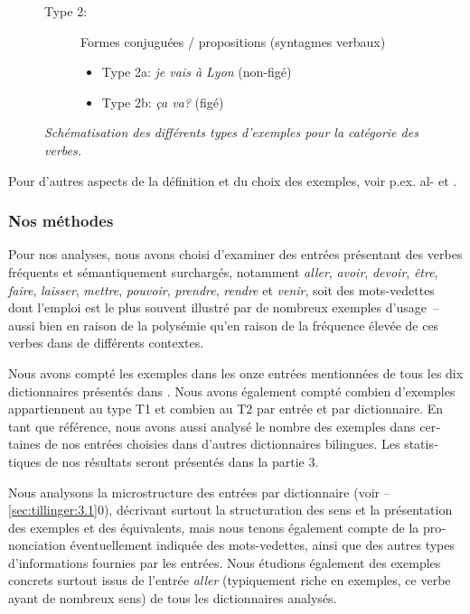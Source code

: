 \documentclass[output=paper,colorlinks,citecolor=brown,arabicfont,chinesefont,booklanguage=french]{langscibook}
\begin{document}
\begin{otherlanguage}{french}
\begin{figure}
{\begin{description}
\item[Type 2:] Formes conjuguées / propositions (syntagmes verbaux)
\begin{itemize}[leftmargin=*]
\item Type 2a: \textit{je vais à Lyon} (non-figé)
\item Type 2b: \textit{ça va?} (figé)
\end{itemize}
\end{description}}
\caption{\emph{Schématisation des différents types d’exemples pour la catégorie des verbes.}}
\label{fig:tillinger:Figure 1}
\end{figure}

Pour d’autres aspects de la définition et du choix des exemples, voir p.ex. al-\citealt{Kasimi1983, Piotrowski2000, Nielsen2014, Karpinska2015}  et \citealt{Belleflamme2019}.

\subsubsection{Nos méthodes}\label{sec:tillinger:2.2.2}

Pour nos analyses, nous avons choisi d’examiner des entrées présentant des verbes fréquents et sémantiquement surchargés, notamment \emph{aller}, \emph{avoir}, \emph{devoir}, \emph{être}, \emph{faire}, \emph{laisser}, \emph{mettre}, \emph{pouvoir}, \emph{prendre}, \emph{rendre} et \emph{venir}, soit des mots-vedettes dont l’emploi est le plus souvent illustré par de nombreux exemples d’usage~-- aussi bien en raison de la polysémie qu’en raison de la fréquence élevée de ces verbes dans de différents contextes.

Nous avons compté les exemples dans les onze entrées mentionnées de tous les dix dictionnaires présentés dans . Nous avons également compté combien d’exemples appartiennent au type T1 et combien au T2 par entrée et par dictionnaire. En tant que référence, nous avons aussi analysé le nombre des exemples dans certaines de nos entrées choisies dans d’autres dictionnaires bilingues. Les statistiques de nos résultats seront présentés dans la partie 3.

Nous analysons la microstructure des entrées par dictionnaire (voir --\ref{sec:tillinger:3.1}0), décrivant surtout la structuration des sens et la présentation des exemples et des équivalents, mais nous tenons également compte de la prononciation éventuellement indiquée des mots-vedettes, ainsi que des autres types d’informations fournies par les entrées. Nous étudions également des exemples concrets surtout issus de l’entrée \emph{aller} (typiquement riche en exemples, ce verbe ayant de nombreux sens) de tous les dictionnaires analysés.


\end{otherlanguage}
\end{document}
